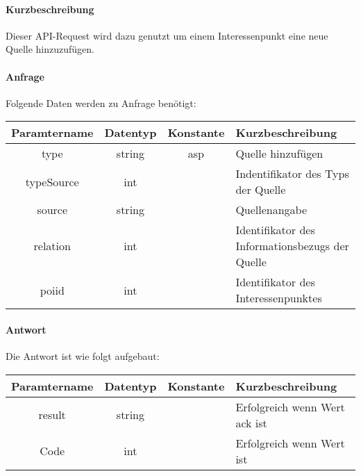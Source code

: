 \paragraph{Kurzbeschreibung}Dieser API-Request wird dazu genutzt um einem Interessenpunkt eine neue Quelle hinzuzufügen.
\paragraph{Anfrage}Folgende Daten werden zu Anfrage benötigt:
\begin{table}[H]
	\begin{tabular}{|c|c|c|p{6.5cm}|}
		\hline
		\textbf{Paramtername} & \textbf{Datentyp} & \textbf{Konstante} & \textbf{Kurzbeschreibung}                                                                                               \\ \hline
		type                & string            & asp                & Quelle hinzufügen \\ \hline
		typeSource          & int               &                    & Indentifikator des Typs der Quelle \\ \hline
		source              & string            &                    & Quellenangabe \\ \hline
		relation            & int               &                    & Identifikator des Informationsbezugs der Quelle \\ \hline
		poiid               & int               &                    & Identifikator des Interessenpunktes \\ \hline
	\end{tabular}
\end{table}
\paragraph{Antwort}Die Antwort ist wie folgt aufgebaut:
\begin{table}[H]
	\begin{tabular}{|c|c|c|p{6.5cm}|}
		\hline
		\textbf{Paramtername} & \textbf{Datentyp} & \textbf{Konstante} & \textbf{Kurzbeschreibung}                                                                                               \\ \hline
		result              & string           &                 & Erfolgreich wenn Wert {\glqq ack\grqq} ist \\ \hline
		Code                & int              &                 & Erfolgreich wenn Wert {\glqq 0\grqq} ist \\ \hline
	\end{tabular}
\end{table}
